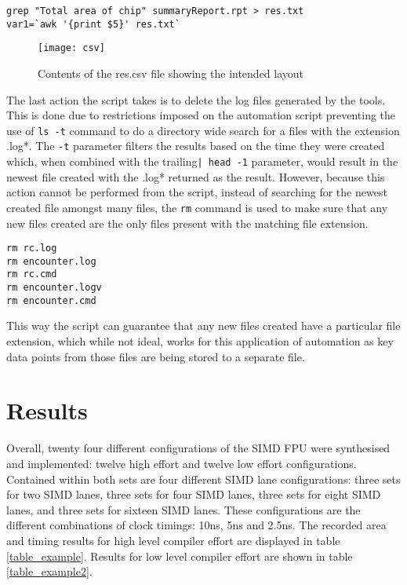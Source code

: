 \documentclass[conference]{IEEEtran}
\begin{document}
\begin{framed}
\begin{lstlisting}
grep "Total area of chip" summaryReport.rpt > res.txt
var1=`awk '{print $5}' res.txt`
\end{lstlisting}
\end{framed}

\begin{figure}[!t]
	\centering
	\texttt{[image: csv]}
	\caption{Contents of the res.csv file showing the intended layout}
	\label{fig_res}
\end{figure}

The last action the script takes is to delete the log files generated by the tools. This is done due to restrictions imposed on the automation script preventing the use of \texttt{ls -t} command to do a directory wide search for a files with the extension .log*. The \texttt{-t} parameter filters the results based on the time they were created which, when combined with the trailing\texttt{| head -1} parameter, would result in the newest file created with the .log* returned as the result. However, because this action cannot be performed from the script, instead of searching for the newest created file amongst many files, the \texttt{rm} command is used to make sure that any new files created are the only files present with the matching file extension. 

\begin{framed}
\begin{verbatim}
rm rc.log
rm encounter.log
rm rc.cmd
rm encounter.logv
rm encounter.cmd
\end{verbatim}
\end{framed}

This way the script can guarantee that any new files created have a particular file extension, which while not ideal, works for this application of automation as key data points from those files are being stored to a separate file.

\section{Results}
Overall, twenty four different configurations of the SIMD FPU were synthesised and implemented: twelve high effort and twelve low effort configurations. Contained within both sets are four different SIMD lane configurations: three sets for two SIMD lanes, three sets for four SIMD lanes, three sets for eight SIMD lanes, and three sets for sixteen SIMD lanes. These configurations are the different combinations of clock timings: 10ns, 5ns and 2.5ns.  The recorded area and timing results for high level compiler effort are displayed in table \ref{table_example}. Results for low level compiler effort are shown in table \ref{table_example2}.
\newline
\end{document}
